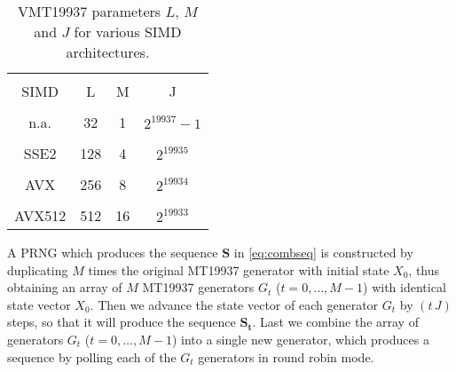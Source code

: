 \documentclass[preprint,1p,times]{elsarticle}
\begin{document}
	\begin{table}[h!]
		\centering
		\begin{tabular}{|c | c | c | c |} 
			\hline
			\vspace{-10pt}  & \vspace{0pt} & \vspace{0pt}& \vspace{0pt} \\
			SIMD   & L   & M & J \\
			\hline
			\vspace{-9pt}  & \vspace{0pt} & \vspace{0pt}& \vspace{0pt} \\
			n.a.   & 32  & 1 & $2^{19937}\!-\!1$ \\		
			\hline
			\vspace{-9pt}  & \vspace{0pt} & \vspace{0pt}& \vspace{0pt} \\
			SSE2   & 128 & 4 & $2^{19935}$ \\		
			\hline
			\vspace{-9pt}  & \vspace{0pt} & \vspace{0pt}& \vspace{0pt} \\
			AVX    & 256 & 8 & $2^{19934}$ \\		
			\hline
			\vspace{-9pt}  & \vspace{0pt} & \vspace{0pt}& \vspace{0pt} \\
			AVX512 & 512 & 16 & $2^{19933}$ \\		
			\hline
		\end{tabular}
		\caption{\label{tab:jvalues} VMT19937 parameters $L$, $M$ and $J$ for various SIMD architectures.}
	\end{table}
	
	A PRNG which produces the sequence $\boldsymbol{S}$ in \eqref{eq:combseq} is constructed by duplicating $M$ times the original MT19937 generator with initial state $X_0$, thus obtaining an array of $M$ MT19937 generators $G_t$ ($t=0,\dots, M-1$) with identical state vector $X_0$. Then we advance the state vector of each generator $G_t$ by $(t\, J)$ steps, so that it will produce the sequence $\boldsymbol{S_t}$. Last we combine the array of generators $G_t$ ($t=0,\dots, M-1$) into a single new generator, which produces a sequence by polling each of the $G_t$ generators in round robin mode.
	
\end{document}
